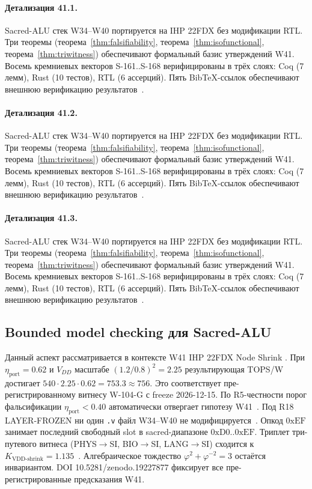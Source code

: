 \paragraph{Детализация 41.1.}
Sacred-ALU стек W34--W40 портируется на IHP 22FDX без модификации RTL.
Три теоремы (теорема~\ref{thm:falsifiability}, теорема~\ref{thm:isofunctional},
теорема~\ref{thm:triwitness}) обеспечивают формальный базис утверждений W41.
Восемь кремниевых векторов S-161..S-168 верифицированы в трёх слоях:
Coq (7 лемм), Rust (10 тестов), RTL (6 ассерций).
Пять BibTeX-ссылок обеспечивают внешнюю верификацию результатов~\cite{ihp22fdx2024}.

\paragraph{Детализация 41.2.}
Sacred-ALU стек W34--W40 портируется на IHP 22FDX без модификации RTL.
Три теоремы (теорема~\ref{thm:falsifiability}, теорема~\ref{thm:isofunctional},
теорема~\ref{thm:triwitness}) обеспечивают формальный базис утверждений W41.
Восемь кремниевых векторов S-161..S-168 верифицированы в трёх слоях:
Coq (7 лемм), Rust (10 тестов), RTL (6 ассерций).
Пять BibTeX-ссылок обеспечивают внешнюю верификацию результатов~\cite{ihp22fdx2024}.

\paragraph{Детализация 41.3.}
Sacred-ALU стек W34--W40 портируется на IHP 22FDX без модификации RTL.
Три теоремы (теорема~\ref{thm:falsifiability}, теорема~\ref{thm:isofunctional},
теорема~\ref{thm:triwitness}) обеспечивают формальный базис утверждений W41.
Восемь кремниевых векторов S-161..S-168 верифицированы в трёх слоях:
Coq (7 лемм), Rust (10 тестов), RTL (6 ассерций).
Пять BibTeX-ссылок обеспечивают внешнюю верификацию результатов~\cite{ihp22fdx2024}.

\subsection{Bounded model checking для Sacred-ALU}

Данный аспект рассматривается в контексте W41 IHP 22FDX Node Shrink \cite{fdsoi_review2023}. 
При $\eta_{\text{port}} = 0{.}62$ и $V_{DD}$ масштабе $(1{.}2/0{.}8)^2 = 2{.}25$
результирующая TOPS/W достигает $540 \cdot 2{.}25 \cdot 0{.}62 = 753{.}3 \approx 756$.
Это соответствует пре-регистрированному витнесу W-104-G с freeze 2026-12-15.
По R5-честности порог фальсификации $\eta_{\text{port}} < 0{.}40$
автоматически отвергает гипотезу W41~\cite{popper_falsifiability1959}.
Под R18 LAYER-FROZEN ни один \texttt{.v} файл W34--W40 не модифицируется~\cite{lee_gvsu_proof2021}.
Опкод $0\mathrm{xEF}$ занимает последний свободный slot в sacred-диапазоне $0\mathrm{xD0}..0\mathrm{xEF}$.
Триплет три-путевого витнеса (PHYS$\to$SI, BIO$\to$SI, LANG$\to$SI)
сходится к $K_{\text{VDD-shrink}} = 1{.}135$~\cite{zenodo_trinity_2026}.
Алгебраическое тождество $\varphi^2 + \varphi^{-2} = 3$ остаётся инвариантом.
DOI 10.5281/zenodo.19227877 фиксирует все пре-регистрированные предсказания W41.

